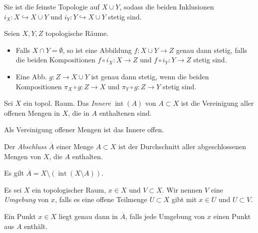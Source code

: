 \documentclass{cheat-sheet}
\DeclareMathOperator{\inte}{int} %
\begin{document}
\begin{bem}
  Sie ist die feinste Topologie auf $X \cup Y$, sodass die beiden Inklusionen $i_X : X \hookrightarrow X \cup Y$ und $i_Y : Y \hookrightarrow X \cup Y$ stetig sind.
\end{bem}

\begin{samepage}
\begin{prop}
  Seien $X, Y, Z$ topologische Räume.
  \begin{itemize}
    \item Falls $X \cap Y = \emptyset$, so ist eine Abbildung $f : X \cup Y \to Z$ genau dann stetig, falls die beiden Kompositionen $f \circ i_X : X \to Z$ und $f \circ i_Y : Y \to Z$ stetig sind.
    \item Eine Abb. $g : Z \to X \cup Y$ ist genau dann stetig, wenn die beiden Kompositionen $\pi_X \circ g : Z \to X$ und $\pi_Y \circ g : Z \to Y$ stetig sind.
  \end{itemize}
\end{prop}
\end{samepage}

\begin{defn}
  Sei $X$ ein topol. Raum. Das \emph{Innere} $\inte(A)$ von $A \subset X$ ist die Vereinigung aller offenen Mengen in $X$, die in $A$ enthaltenen sind.
\end{defn}

\begin{bem}
  Als Vereinigung offener Mengen ist das Innere offen.
\end{bem}


\begin{defn}
  Der \emph{Abschluss} $\overline{A}$ einer Menge $A \subset X$ ist der Durchschnitt aller abgeschlossenen Mengen von $X$, die $A$ enthalten.
\end{defn}

\begin{bem}
  Es gilt $\overline{A} = X \setminus (\inte(X \setminus A))$.
\end{bem}

\begin{defn}
  Es sei $X$ ein topologischer Raum, $x \in X$ und $V \subset X$. Wir nennen $V$ eine \emph{Umgebung} von $x$, falls es eine offene Teilmenge $U \subset X$ gibt mit $x \in U$ und $U \subset V$.
\end{defn}

\begin{prop}
  Ein Punkt $x \in X$ liegt genau dann in $\overline{A}$, falls jede Umgebung von $x$ einen Punkt aus $A$ enthält.
\end{prop}
\end{document}
